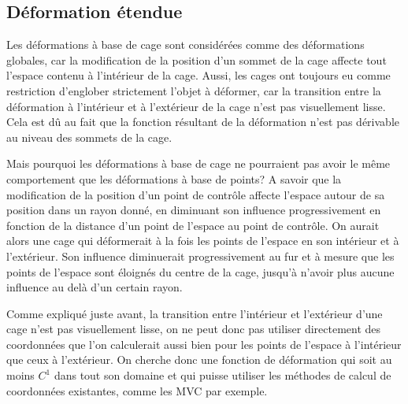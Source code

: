 \subsection{Déformation étendue}

Les déformations à base de cage sont considérées comme des déformations
globales, car la modification de la position d'un sommet de la cage affecte
tout l'espace contenu à l'intérieur de la cage. Aussi, les cages ont toujours
eu comme restriction d'englober strictement l'objet à déformer, car la
transition entre la déformation à l'intérieur et à l'extérieur de la cage
n'est pas visuellement lisse. Cela est dû au fait que la fonction résultant de
la déformation n'est pas dérivable au niveau des sommets de la cage.

Mais pourquoi les déformations à base de cage ne pourraient pas avoir le même
comportement que les déformations à base de points? A savoir que la
modification de la position d'un point de contrôle affecte l'espace autour de
sa position dans un rayon donné, en diminuant son influence progressivement en
fonction de la distance d'un point de l'espace au point de contrôle. On aurait
alors une cage qui déformerait à la fois les points de l'espace en son
intérieur et à l'extérieur. Son influence diminuerait progressivement au fur
et à mesure que les points de l'espace sont éloignés du centre de la cage,
jusqu'à n'avoir plus aucune influence au delà d'un certain rayon.

Comme expliqué juste avant, la transition entre l'intérieur et l'extérieur
d'une cage n'est pas visuellement lisse, on ne peut donc pas utiliser
directement des coordonnées que l'on calculerait aussi bien pour les points de
l'espace à l'intérieur que ceux à l'extérieur. On cherche donc une fonction de
déformation qui soit au moins $C^1$ dans tout son domaine et qui puisse
utiliser les méthodes de calcul de coordonnées existantes, comme les MVC par
exemple.


